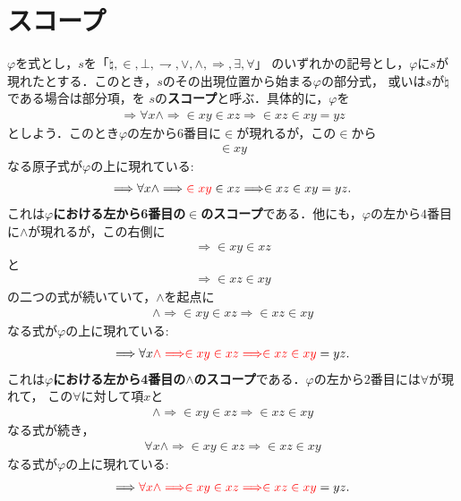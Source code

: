 \section{スコープ}
	$\varphi$を式とし，$s$を「$\natural,\in,\bot,\rightharpoondown,\vee,\wedge,\Longrightarrow,\exists,\forall$」
	のいずれかの記号とし，$\varphi$に$s$が現れたとする．このとき，$s$のその出現位置から始まる$\varphi$の部分式，
	或いは$s$が$\natural$である場合は部分項，を
	$s$の{\bf スコープ}と呼ぶ．具体的に，$\varphi$を
	\begin{align}
		\Longrightarrow \forall x \wedge \Longrightarrow \in xy \in xz \Longrightarrow \in xz \in xy = yz
	\end{align}
	としよう．このとき$\varphi$の左から$6$番目に$\in$が現れるが，この$\in$から
	\begin{align}
		\in xy
	\end{align}
	なる原子式が$\varphi$の上に現れている:
	\begin{align}
		\Longrightarrow \forall x \wedge \Longrightarrow \textcolor{red}{\in xy} \in xz \Longrightarrow \in xz \in xy = yz.
	\end{align}
	これは{\bf $\varphi$における左から6番目の$\in$のスコープ}である．他にも，$\varphi$の左から$4$番目に$\wedge$が現れるが，この右側に
	\begin{align}
		\Longrightarrow \in xy \in xz
	\end{align}
	と
	\begin{align}
		\Longrightarrow \in xz \in xy
	\end{align}
	の二つの式が続いていて，$\wedge$を起点に
	\begin{align}
		\wedge \Longrightarrow \in xy \in xz \Longrightarrow \in xz \in xy
	\end{align}
	なる式が$\varphi$の上に現れている:
	\begin{align}
		\Longrightarrow \forall x \textcolor{red}{\wedge \Longrightarrow \in xy \in xz \Longrightarrow \in xz \in xy} = yz.
	\end{align}
	これは{\bf $\varphi$における左から4番目の$\wedge$のスコープ}である．$\varphi$の左から$2$番目には$\forall$が現れて，
	この$\forall$に対して項$x$と
	\begin{align}
		\wedge \Longrightarrow \in xy \in xz \Longrightarrow \in xz \in xy
	\end{align}
	なる式が続き，
	\begin{align}
		\forall x \wedge \Longrightarrow \in xy \in xz \Longrightarrow \in xz \in xy
	\end{align}
	なる式が$\varphi$の上に現れている:
	\begin{align}
		\Longrightarrow \textcolor{red}{\forall x \wedge \Longrightarrow \in xy \in xz \Longrightarrow \in xz \in xy} = yz.
	\end{align}
	
